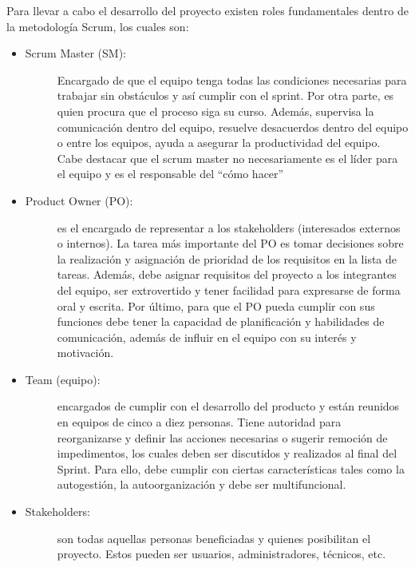 Para llevar a cabo el desarrollo del proyecto existen roles fundamentales dentro de la metodología Scrum, los cuales son:

\begin{itemize}
    \item   \begin{description}
                \item[Scrum Master (SM):] Encargado de que el equipo tenga todas las condiciones necesarias para trabajar sin obstáculos y así cumplir con el sprint. Por otra parte, es quien procura que el proceso siga su curso. Además, supervisa la comunicación dentro del equipo, resuelve desacuerdos dentro del equipo o entre los equipos, ayuda a asegurar la productividad del equipo. Cabe destacar que el scrum master no necesariamente es el líder para el equipo y es el responsable del ``cómo hacer''
            \end{description}    
    
    \item   \begin{description}
                \item[Product Owner (PO):] es el encargado de representar a los stakeholders (interesados externos o internos). La tarea más importante del PO es tomar decisiones sobre la realización y asignación de prioridad de los requisitos en la lista de tareas. Además, debe asignar requisitos del proyecto a los integrantes del equipo, ser extrovertido y tener facilidad para expresarse de forma oral y escrita. Por último, para que el PO pueda cumplir con sus funciones debe tener la capacidad de planificación y habilidades de comunicación, además de influir en el equipo con su interés y motivación.
            \end{description} 
    
    \item   \begin{description}
                \item[Team (equipo):] encargados de cumplir con el desarrollo del producto y están reunidos en equipos de cinco a diez personas. Tiene autoridad para reorganizarse y definir las acciones necesarias o sugerir remoción de impedimentos, los cuales deben ser discutidos y realizados al final del Sprint. Para ello, debe cumplir con ciertas características tales como la autogestión, la autoorganización y debe ser multifuncional.
            \end{description} 
    
    \item   \begin{description}
                \item[Stakeholders:] son todas aquellas personas beneficiadas y quienes posibilitan el proyecto. Estos pueden ser usuarios, administradores, técnicos, etc.
            \end{description}  
\end{itemize}
